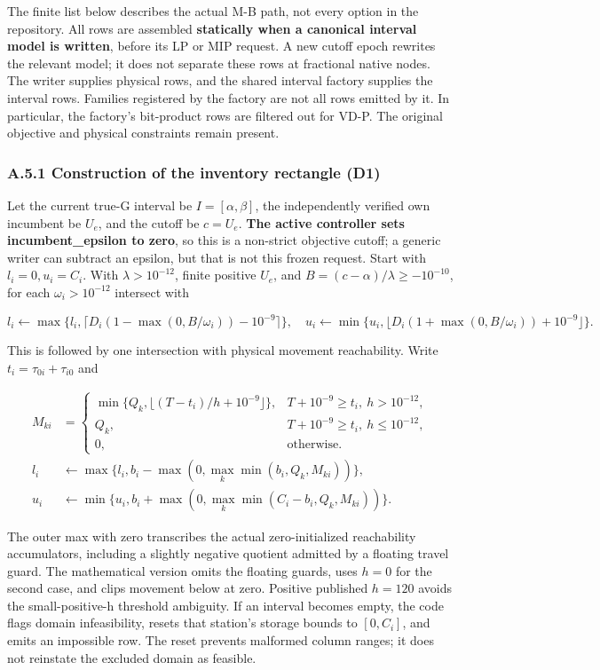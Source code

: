 \documentclass[
  american,
  11pt,
]{article}
\begin{document}
The finite list below describes the actual M-B path, not every option in
the repository. All rows are assembled \textbf{statically when a
canonical interval model is written}, before its LP or MIP request. A
new cutoff epoch rewrites the relevant model; it does not separate these
rows at fractional native nodes. The writer supplies physical rows, and
the shared interval factory supplies the interval rows. Families
registered by the factory are not all rows emitted by it. In particular,
the factory's bit-product rows are filtered out for VD-P. The original
objective and physical constraints remain present.

\subsubsection{A.5.1 Construction of the inventory rectangle
(D1)}\label{a.5.1-construction-of-the-inventory-rectangle-d1}

Let the current true-G interval be \(I=[\alpha,\beta]\), the
independently verified own incumbent be \(U_e\), and the cutoff be
\(c=U_e\). \textbf{The active controller sets incumbent\_\allowbreak{}epsilon to
zero}, so this is a non-strict objective cutoff; a generic writer can
subtract an epsilon, but that is not this frozen request. Start with
\(l_i=0,u_i=C_i\). With \(\lambda>10^{-12}\), finite positive \(U_e\),
and \(B=(c-\alpha)/\lambda\ge-10^{-10}\), for each \(\omega_i>10^{-12}\)
intersect with

\[
l_i\gets\max\{l_i,\lceil D_i(1-\max(0,B/\omega_i))-10^{-9}\rceil\},\quad
u_i\gets\min\{u_i,\lfloor D_i(1+\max(0,B/\omega_i))+10^{-9}\rfloor\}.
\tag{A19}
\]

This is followed by one intersection with physical movement
reachability. Write \(t_i=\tau_{0i}+\tau_{i0}\) and

\[
\begin{aligned}
M_{ki}&=\begin{cases}
\min\{Q_k,\lfloor(T-t_i)/h+10^{-9}\rfloor\},&T+10^{-9}\ge t_i,\ h>10^{-12},\\
Q_k,&T+10^{-9}\ge t_i,\ h\le10^{-12},\\0,&\text{otherwise}.
\end{cases}\\
l_i&\gets\max\{l_i,b_i-\max(0,\max_k\min(b_i,Q_k,M_{ki}))\},\\
u_i&\gets\min\{u_i,b_i+\max(0,\max_k\min(C_i-b_i,Q_k,M_{ki}))\}.
\end{aligned}
\tag{A20}
\]

The outer max with zero transcribes the actual zero-initialized
reachability accumulators, including a slightly negative quotient
admitted by a floating travel guard. The mathematical version omits the
floating guards, uses \(h=0\) for the second case, and clips movement
below at zero. Positive published \(h=120\) avoids the small-positive-h
threshold ambiguity. If an interval becomes empty, the code flags domain
infeasibility, resets that station's storage bounds to \([0,C_i]\), and
emits an impossible row. The reset prevents malformed column ranges; it
does not reinstate the excluded domain as feasible.
\end{document}
